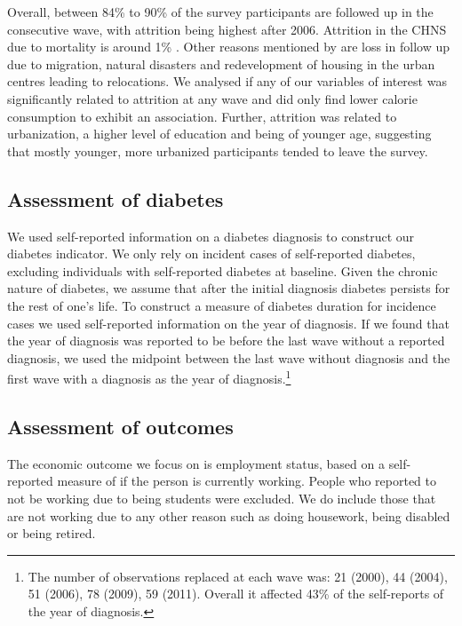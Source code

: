 Overall, between 84\% to 90\% of the survey participants are followed up in the consecutive wave, with attrition being highest after 2006. Attrition in the \ac{CHNS} due to mortality is around 1\% \parencite{Popkin2010}. Other reasons mentioned by \textcite{Popkin2010} are loss in follow up due to migration, natural disasters and redevelopment of housing in the urban centres leading to relocations. We analysed if any of our variables of interest was significantly related to attrition at any wave and did only find lower calorie consumption to exhibit an association. Further, attrition was related to urbanization, a higher level of education and being of younger age, suggesting that mostly younger, more urbanized participants tended to leave the survey. 


\subsection{Assessment of diabetes}

We used self-reported information on a diabetes diagnosis to construct our diabetes indicator. We only rely on incident cases of self-reported diabetes, excluding individuals with self-reported diabetes at baseline. Given the chronic nature of diabetes, we assume that after the initial diagnosis diabetes persists for the rest of one's life. To construct a measure of diabetes duration for incidence cases we used self-reported information on the year of diagnosis. If we found that the year of diagnosis was reported to be before the last wave without a reported diagnosis, we used the midpoint between the last wave without diagnosis and the first wave with a diagnosis as the year of diagnosis.\footnote{The number of observations replaced at each wave was: 21 (2000), 44 (2004), 51  (2006), 78 (2009), 59 (2011). Overall it affected 43\% of the self-reports of the year of diagnosis.}

\subsection{Assessment of outcomes}

The economic outcome we focus on is employment status, based on a self-reported measure of if the person is currently working. People who reported to not be working due to being students were excluded. We do include those that are not working due to any other reason such as doing housework, being disabled or being retired. 

